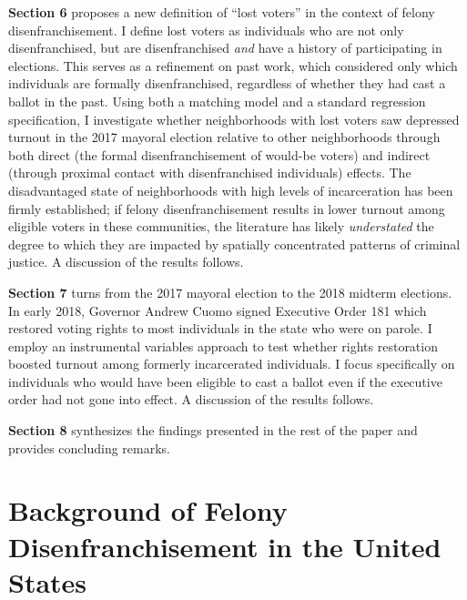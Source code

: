 \documentclass[
  12pt,
]{article}
\begin{document}
\textbf{Section 6} proposes a new definition of ``lost voters'' in the context of felony disenfranchisement. I define lost voters as individuals who are not only disenfranchised, but are disenfranchised \emph{and} have a history of participating in elections. This serves as a refinement on past work, which considered only which individuals are formally disenfranchised, regardless of whether they had cast a ballot in the past. Using both a matching model and a standard regression specification, I investigate whether neighborhoods with lost voters saw depressed turnout in the 2017 mayoral election relative to other neighborhoods through both direct (the formal disenfranchisement of would-be voters) and indirect (through proximal contact with disenfranchised individuals) effects. The disadvantaged state of neighborhoods with high levels of incarceration has been firmly established; if felony disenfranchisement results in lower turnout among eligible voters in these communities, the literature has likely \emph{understated} the degree to which they are impacted by spatially concentrated patterns of criminal justice. A discussion of the results follows.

\textbf{Section 7} turns from the 2017 mayoral election to the 2018 midterm elections. In early 2018, Governor Andrew Cuomo signed Executive Order 181 which restored voting rights to most individuals in the state who were on parole. I employ an instrumental variables approach to test whether rights restoration boosted turnout among formerly incarcerated individuals. I focus specifically on individuals who would have been eligible to cast a ballot even if the executive order had not gone into effect. A discussion of the results follows.

\textbf{Section 8} synthesizes the findings presented in the rest of the paper and provides concluding remarks.

\hypertarget{background-of-felony-disenfranchisement-in-the-united-states}{%
\section{Background of Felony Disenfranchisement in the United States}\label{background-of-felony-disenfranchisement-in-the-united-states}}
\end{document}
